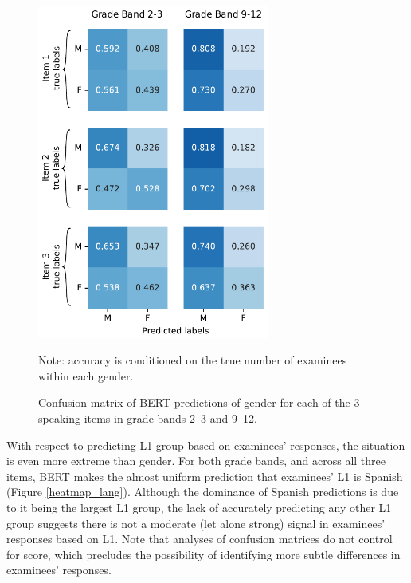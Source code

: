 \documentclass [PhD] {uclathes}
\begin{document}
\begin{figure}[h]
    \centering
    \caption{Confusion matrix of BERT predictions of gender for each of the 3 speaking items in grade bands 2–3 and 9–12.}    
    \includegraphics[width=3in]{figures/20230516_gender805_heatmap_edit.pdf}
    \label{heatmap_gend}
	{\newline Note: accuracy is conditioned on the true number of examinees within each gender. \par}
\end{figure}

With respect to predicting L1 group based on examinees’ responses, the situation is even more extreme than gender. For both grade bands, and across all three items, BERT makes the almost uniform prediction that examinees’ L1 is Spanish (Figure \ref{heatmap_lang}). Although the dominance of Spanish predictions is due to it being the largest L1 group, the lack of accurately predicting any other L1 group suggests there is not a moderate (let alone strong) signal in examinees’ responses based on L1. Note that analyses of confusion matrices do not control for score, which precludes the possibility of identifying more subtle differences in examinees’ responses. 
\end{document}
